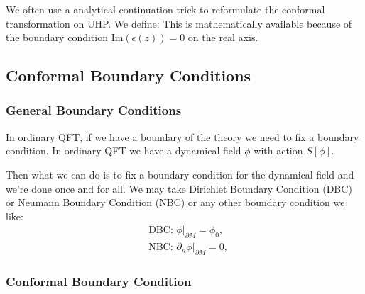 We often use a analytical continuation trick to reformulate the conformal transformation on UHP. We define:
This is mathematically available because of the boundary condition $ \mathrm{Im}(\epsilon(z))=0 $ on the real axis.

\subsection{Conformal Boundary Conditions}

\subsubsection{General Boundary Conditions}

In ordinary QFT, if we have a boundary of the theory we need to fix a boundary condition. In ordinary QFT we have a dynamical field $ \phi $ with action $ S[\phi] $. 

Then what we can do is to fix a boundary condition for the dynamical field and we're done once and for all. We may take Dirichlet Boundary Condition (DBC) or Neumann Boundary Condition (NBC) or any other boundary condition we like:
\begin{align}
  & \text{DBC: } \phi|_{\partial M} = \phi_0, \\
  & \text{NBC: } \partial_n \phi|_{\partial M} = 0, 
\end{align}

\subsubsection{Conformal Boundary Condition}


